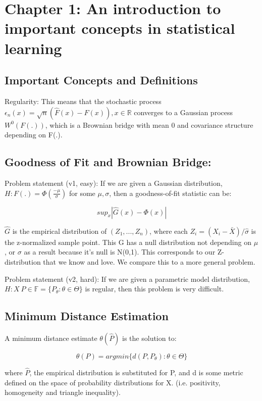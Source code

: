 \documentclass{article}
\begin{document}
\section{Chapter 1: An introduction to important concepts in statistical learning}
  \label{sec:chapterone}
  \subsection{Important Concepts and Definitions}
  	Regularity: This means that the stochastic process $\epsilon_n(x) = \sqrt{n} (\hat{F}(x) - F(x)), x \in \mathbb{R}$ converges to a Gaussian process $W^0(F(.))$, which is a Brownian bridge with mean 0 and covariance structure depending on F(.). 


	\subsection{Goodness of Fit and Brownian Bridge:}
	  	Problem statement (v1, easy): If we are given a Gaussian distribution, $H: F(.) = \Phi(\frac{-\mu}{\sigma})$ for some $\mu, \sigma$, then a goodness-of-fit statistic can be:

	  	$$sup_x | \hat{G}(x) - \Phi(x) |$$

	  	$\hat{G}$ is the empirical distribution of $(Z_1, ..., Z_n)$, where each $Z_i = (X_i - \bar{X})/\hat{\sigma}$ is the z-normalized sample point. This G has a null distribution not depending on $\mu$, or $\sigma$ as a result because it's null is N(0,1). This corresponds to our Z-distribution that we know and love. We compare this to a more general problem.

	  	Problem statement (v2, hard): If we are given a parametric model distribution, $H: X ~ P \in \mathbb{F} = \{P_\theta : \theta \in \Theta \}$ is regular, then this problem is very difficult. 

	\subsection{Minimum Distance Estimation}
		A minimum distance estimate $\theta(\hat{P})$ is the solution to:

		$$\theta(P) = argmin\{ d(P, P_\theta) : \theta \in \Theta \}$$

		where $\hat{P}$, the empirical distribution is substituted for P, and d is some metric defined on the space of probability distributions for X. (i.e. positivity, homogeneity and triangle inequality). 
\end{document}
